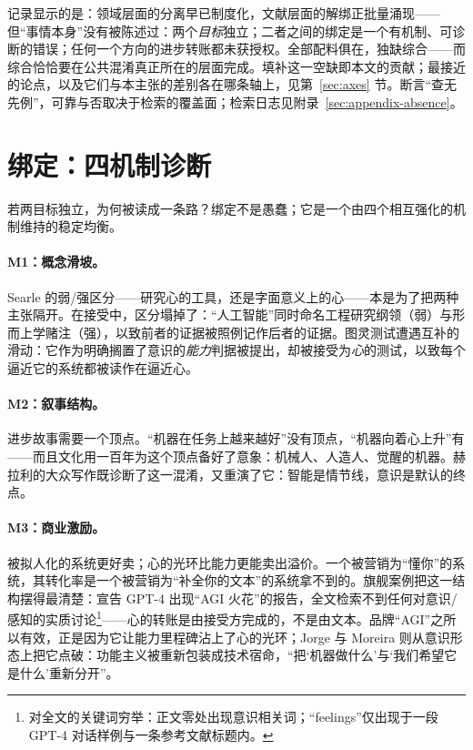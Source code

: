 \documentclass[10pt,fontset=fandol]{ctexart}
\begin{document}
记录显示的是：领域层面的分离早已制度化，文献层面的解绑正批量涌现——但“事情本身”没有被陈述过：两个\emph{目标}独立；二者之间的绑定是一个有机制、可诊断的错误；任何一个方向的进步转账都未获授权。全部配料俱在，独缺综合——而综合恰恰要在公共混淆真正所在的层面完成。填补这一空缺即本文的贡献；最接近的论点，以及它们与本主张的差别各在哪条轴上，见第~\ref{sec:axes} 节。断言“查无先例”，可靠与否取决于检索的覆盖面；检索日志见附录~\ref{sec:appendix-absence}。

\section{绑定：四机制诊断}\label{sec:pathology}

若两目标独立，为何被读成一条路？绑定不是愚蠢；它是一个由四个相互强化的机制维持的稳定均衡。

\paragraph{M1：概念滑坡。}Searle 的弱/强区分——研究心的工具，还是字面意义上的心\cite{searle1980}——本是为了把两种主张隔开。在接受中，区分塌掉了：“人工智能”同时命名工程研究纲领（弱）与形而上学赌注（强），以致前者的证据被照例记作后者的证据。图灵测试遭遇互补的滑动：它作为明确搁置了意识的\emph{能力}判据被提出\cite{turing1950}，却被接受为\emph{心}的测试，以致每个逼近它的系统都被读作在逼近心。

\paragraph{M2：叙事结构。}进步故事需要一个顶点。“机器在任务上越来越好”没有顶点，“机器向着心上升”有——而且文化用一百年为这个顶点备好了意象：机械人、人造人、觉醒的机器。赫拉利的大众写作既诊断了这一混淆，又重演了它：智能是情节线，意识是默认的终点\cite{harari2024nexus}。

\paragraph{M3：商业激励。}被拟人化的系统更好卖；心的光环比能力更能卖出溢价。一个被营销为“懂你”的系统，其转化率是一个被营销为“补全你的文本”的系统拿不到的。旗舰案例把这一结构摆得最清楚：宣告 GPT-4 出现“AGI 火花”的报告，全文检索不到任何对意识/感知的实质讨论\footnote{对全文的关键词穷举：正文零处出现意识相关词；“feelings”仅出现于一段 GPT-4 对话样例与一条参考文献标题内\cite{bubeck2023sparks}。}\cite{bubeck2023sparks}——心的转账是由接受方完成的，不是由文本。品牌“AGI”之所以有效，正是因为它让能力里程碑沾上了心的光环；Jorge 与 Moreira 则从意识形态上把它点破：功能主义被重新包装成技术宿命，“把‘机器做什么’与‘我们希望它是什么’重新分开”\cite{jorge2026harsh}。
\end{document}
